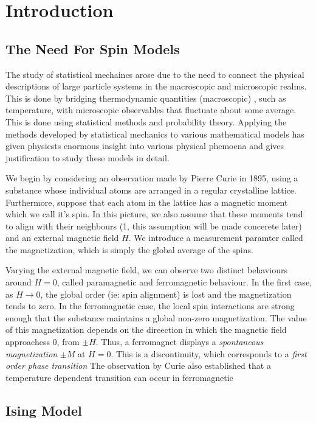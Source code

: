 \chapter{Introduction}
	\section{The Need For Spin Models}
	The study of statistical mechaincs arose due to the need to connect the physical descriptions
	of large particle systems in the macroscopic and microscopic realms. This is done by bridging 
	thermodynamic quantities (macroscopic) , such as temperature, with microscopic
	observables that fluctuate about some average. This is done using statistical methods and 
	probability theory. Applying the methods developed by statistical mechanics to various mathematical 
	models has given physicsts enormous insight into various physical phemoena and gives justification 
	to study these models in detail. 

	We begin by considering an observation made by Pierre Curie in 1895, using a substance 
	whose individual atoms are arranged in a regular crystalline lattice. Furthermore, 
	suppose that each atom in the lattice has a magnetic moment which we call it's spin. In 
	this picture, we also assume that these moments tend to align with their neighbours
	(1, this assumption will be made concerete later) and an external magnetic field $H$. We introduce
	a measurement paramter called the magnetization, which is simply the global average of the spins.

	Varying the external magnetic field, we can observe two distinct behaviours around $H=0$, called
	paramagnetic and ferromagnetic behaviour. In the first case, as $H \rightarrow 0$, the global 
	order (ie: spin alignment) is lost and the magnetization tends to zero. In the ferromagnetic case, 
	the local spin interactions are strong enough that the substance maintains a global non-zero 
	magnetization. The value of this magnetization depends on the direection in which the magnetic field
	approachess $0$, from $\pm H$. Thus, a ferromagnet displays a \textit{spontaneous magnetization} 
	$\pm M$ at $H=0$. This is a discontinuity, which corresponds to a \textit{first order phase transition} 
	The observation by Curie also established that a temperature dependent transition can occur in 
	ferromagnetic 

	
	 

	\section{Ising Model}

